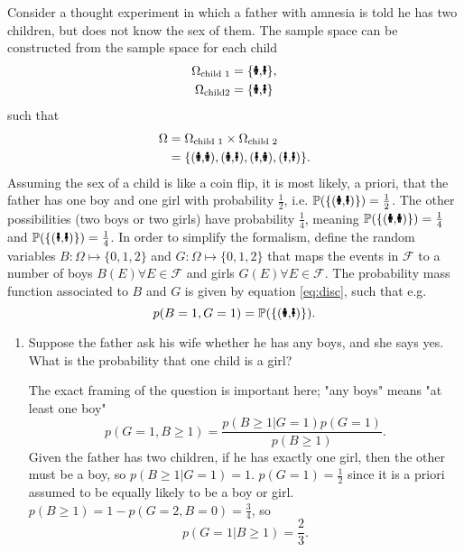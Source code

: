 \begin{example}
	Consider a thought experiment in which a father with amnesia is told he has two children, but does not know the sex of them. The sample space can be constructed from the sample space for each child
	\begin{equation}
		\begin{split}
			\Omega_{\text{child 1}} &= \{\text{\Gentsroom,\Ladiesroom}\},\\
			\Omega_{\text{child2}} &= \{\text{\Gentsroom,\Ladiesroom}\}\\
		\end{split}
	\end{equation}
	such that
	\begin{equation}
		\begin{split}
			\Omega &= \Omega_{\text{child 1}}\times \Omega_{\text{child 2}}\\
			&= \{(\text{\Gentsroom,\Gentsroom}),(\text{\Gentsroom,\Ladiesroom}),(\text{\Ladiesroom,\Gentsroom}),(\text{\Ladiesroom,\Ladiesroom})\}.
		\end{split}
	\end{equation}
	Assuming the sex of a child is like a coin flip, it is most likely, a priori, that the father has one boy and one girl with probability $\frac{1}{2}$, i.e.  $\mathbb{P}(\{(\text{\Gentsroom,\Ladiesroom})\})=\frac{1}{2}$. The other possibilities (two boys or two girls) have probability $\frac{1}{4}$, meaning $\mathbb{P}(\{(\text{\Gentsroom,\Gentsroom})\})=\frac{1}{4}$ and $\mathbb{P}(\{(\text{\Ladiesroom,\Ladiesroom})\})=\frac{1}{4}$. In order to simplify the formalism, define the random variables $B: \Omega \mapsto \{0,1,2\}$ and $G: \Omega \mapsto \{0,1,2\}$ that maps the events in $\mathcal{F}$ to a number of boys $B(E)\forall E\in \mathcal{F}$ and girls $G(E)\forall E\in \mathcal{F}$. The probability mass function associated to $B$ and $G$ is given by equation \eqref{eq:disc}, such that e.g.
	\begin{equation}
		p(B = 1, G = 1)= \mathbb{P}(\{(\text{\Gentsroom,\Ladiesroom})\}).
	\end{equation}

	\begin{enumerate}
		\item Suppose the father ask his wife whether he has any boys, and she says yes. What is the probability that one child is a girl?
		
		The exact framing of the question is important here; "any boys" means "at least one boy"
		\begin{equation}
			p(G=1,B\geq 1) = \frac{p(B\geq1|G=1)p(G=1)}{p(B\geq 1)}.
		\end{equation}
		Given the father has two children, if he has exactly one girl, then the other must be a boy, so $p(B\geq 1|G=1)=1$. $p(G=1)=\frac{1}{2}$ since it is a priori assumed to be equally likely to be a boy or girl. $p(B\geq 1)=1-p(G=2,B=0)=\frac{3}{4}$, so
		\begin{equation}
			p(G=1|B\geq 1) = \frac{2}{3}.
		\end{equation}
		

\end{enumerate}
\end{example}
